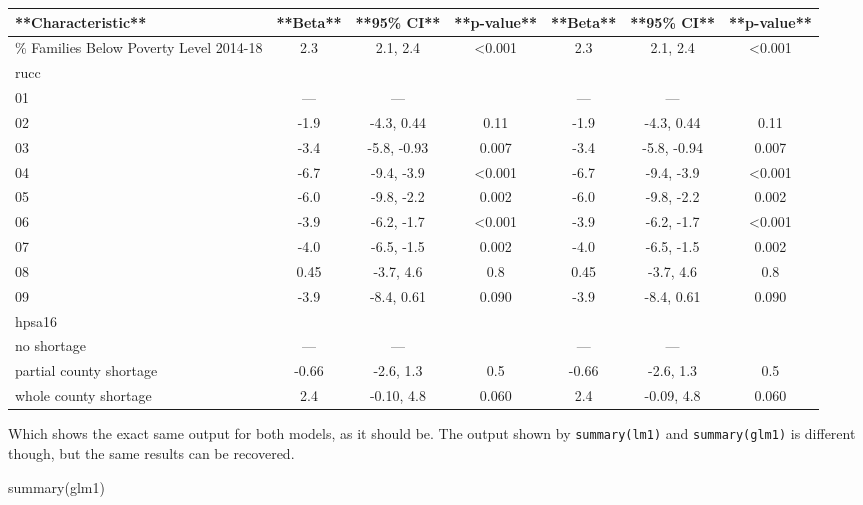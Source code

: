 \documentclass[
  letterpaper,
  DIV=11,
  numbers=noendperiod]{scrreprt}
\newenvironment{Shaded}{\begin{snugshade}}{\end{snugshade}}
\newcommand{\FunctionTok}[1]{\textcolor[rgb]{0.28,0.35,0.67}{#1}}
\newcommand{\NormalTok}[1]{\textcolor[rgb]{0.00,0.23,0.31}{#1}}
\begin{document}
\begin{tabular}{l|c|c|c|c|c|c}
\hline
**Characteristic** & **Beta** & **95\% CI** & **p-value** & **Beta** & **95\% CI** & **p-value**\\
\hline
\% Families Below Poverty Level 2014-18 & 2.3 & 2.1, 2.4 & <0.001 & 2.3 & 2.1, 2.4 & <0.001\\
\hline
rucc &  &  &  &  &  & \\
\hline
01 & — & — &  & — & — & \\
\hline
02 & -1.9 & -4.3, 0.44 & 0.11 & -1.9 & -4.3, 0.44 & 0.11\\
\hline
03 & -3.4 & -5.8, -0.93 & 0.007 & -3.4 & -5.8, -0.94 & 0.007\\
\hline
04 & -6.7 & -9.4, -3.9 & <0.001 & -6.7 & -9.4, -3.9 & <0.001\\
\hline
05 & -6.0 & -9.8, -2.2 & 0.002 & -6.0 & -9.8, -2.2 & 0.002\\
\hline
06 & -3.9 & -6.2, -1.7 & <0.001 & -3.9 & -6.2, -1.7 & <0.001\\
\hline
07 & -4.0 & -6.5, -1.5 & 0.002 & -4.0 & -6.5, -1.5 & 0.002\\
\hline
08 & 0.45 & -3.7, 4.6 & 0.8 & 0.45 & -3.7, 4.6 & 0.8\\
\hline
09 & -3.9 & -8.4, 0.61 & 0.090 & -3.9 & -8.4, 0.61 & 0.090\\
\hline
hpsa16 &  &  &  &  &  & \\
\hline
no shortage & — & — &  & — & — & \\
\hline
partial county shortage & -0.66 & -2.6, 1.3 & 0.5 & -0.66 & -2.6, 1.3 & 0.5\\
\hline
whole county shortage & 2.4 & -0.10, 4.8 & 0.060 & 2.4 & -0.09, 4.8 & 0.060\\
\hline
\end{tabular}

Which shows the exact same output for both models, as it should be. The
output shown by \texttt{summary(lm1)} and \texttt{summary(glm1)} is
different though, but the same results can be recovered.

\begin{Shaded}
\begin{Highlighting}[]
\FunctionTok{summary}\NormalTok{(glm1)}
\end{Highlighting}
\end{Shaded}
\end{document}
